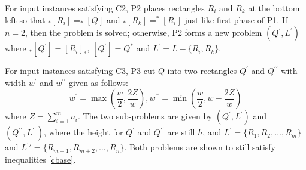 \documentclass[sigplan,screen,nonacm]{acmart}\settopmatter{printfolios=true,printccs=false,printacmref=false}
\begin{document}
\par For input instances satisfying C2, P2 places rectangles $R_i$ and $R_k$ at the bottom left so that $_*[R_i]=_*[Q]$ and $_*[R_k]=^*[R_i]$ just like first phase of P1. If $n=2$, then the problem is solved; otherwise, P2 forms a new problem $(Q^\prime, L^\prime)$ where $_*[Q^\prime]=[R_i]_*$, $[Q^\prime]=Q^*$ and $L^\prime=L-\{R_i, R_k\}$.
\par For input instances satisfying C3, P3 cut $Q$ into two rectangles $Q^\prime$ and $Q^{\prime\prime}$ with width $w^\prime$ and $w^{\prime\prime}$ given as follows:
\begin{equation}
	w^\prime=\max(\frac{w}{2},\frac{2Z}{w}), w^{\prime\prime}=\min(\frac{w}{2},w-\frac{2Z}{w})
\end{equation}
where $Z=\sum_{i=1}^{m}a_i$. The two sub-problems are given by $(Q^\prime,L^\prime)$ and $(Q^{\prime\prime},L^{\prime\prime})$, where the height for $Q^\prime$ and $Q^{\prime\prime}$ are still $h$, and $L^\prime=\{R_1,R_2,\ldots,R_m\}$ and $L^\prime\prime=\{R_{m+1},R_{m+2},\ldots, R_n\}$. Both problems are shown to still satisfy inequalities \ref{cbase}.


\end{document}
